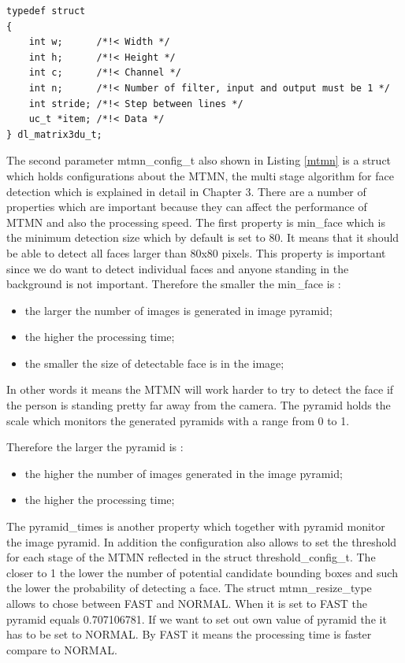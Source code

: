 \begin{lstlisting}[caption={Image matrix structure},label=image_matrix, captionpos=b]
typedef struct
{
    int w;      /*!< Width */
    int h;      /*!< Height */
    int c;      /*!< Channel */
    int n;      /*!< Number of filter, input and output must be 1 */
    int stride; /*!< Step between lines */
    uc_t *item; /*!< Data */
} dl_matrix3du_t;

\end{lstlisting}


The second parameter {\selectfont mtmn\_config\_t} also shown in Listing \ref{mtmn} is a struct which holds configurations about the MTMN, the multi stage algorithm for face detection which is explained in detail in Chapter 3. There are a number of properties which are important because they can affect the performance of MTMN and also the processing speed. The first property is 
{\selectfont min\_face} which is the minimum detection size which by default is set to 80. It means that it should be able to detect all faces larger than 80x80 pixels. This property is important since we do want to detect individual faces and anyone standing in the background is not important. Therefore the smaller the {\selectfont min\_face} is : 

\begin{itemize}
    \item the larger the number of images is generated in image pyramid;
    \item the higher the processing time;
     \item the smaller the size of detectable face is in the image;
\end{itemize}


In other words it means the MTMN will work harder to try to detect the face if the person is standing pretty far away from the camera. 
The {\selectfont pyramid} holds the scale which monitors the generated pyramids with a range from 0 to 1. 

Therefore the larger the {\selectfont pyramid} is : 
\begin{itemize}
    \item the higher the number of images generated in the image pyramid;
    \item the higher the processing time;
\end{itemize}

The {\selectfont pyramid\_times} is another property which together with {\selectfont pyramid} monitor the image pyramid. In addition the configuration also allows to set the threshold for each stage of the MTMN reflected in the struct {\selectfont threshold\_config\_t}. The closer to 1 the lower the number of potential candidate bounding boxes and such the lower the probability of detecting a face. 
The struct {\selectfont mtmn\_resize\_type} allows to chose between FAST and NORMAL. When it is set to FAST the {\selectfont pyramid} equals 0.707106781. If we want to set out own value of {\selectfont pyramid} the it has to be set to NORMAL. By FAST it means the processing time is faster compare to NORMAL. 


